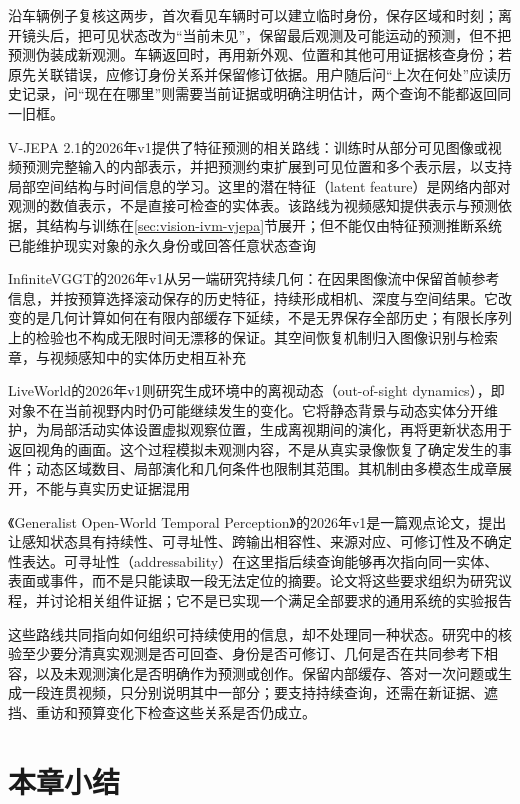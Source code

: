 沿车辆例子复核这两步，首次看见车辆时可以建立临时身份，保存区域和时刻；离开镜头后，把可见状态改为“当前未见”，保留最后观测及可能运动的预测，但不把预测伪装成新观测。车辆返回时，再用新外观、位置和其他可用证据核查身份；若原先关联错误，应修订身份关系并保留修订依据。用户随后问“上次在何处”应读历史记录，问“现在在哪里”则需要当前证据或明确注明估计，两个查询不能都返回同一旧框。

V-JEPA 2.1的2026年v1提供了特征预测的相关路线：训练时从部分可见图像或视频预测完整输入的内部表示，并把预测约束扩展到可见位置和多个表示层，以支持局部空间结构与时间信息的学习。这里的潜在特征（latent feature）是网络内部对观测的数值表示，不是直接可检查的实体表。该路线为视频感知提供表示与预测依据，其结构与训练在\ref{sec:vision-ivm-vjepa}节展开；但不能仅由特征预测推断系统已能维护现实对象的永久身份或回答任意状态查询

InfiniteVGGT的2026年v1从另一端研究持续几何：在因果图像流中保留首帧参考信息，并按预算选择滚动保存的历史特征，持续形成相机、深度与空间结果。它改变的是几何计算如何在有限内部缓存下延续，不是无界保存全部历史；有限长序列上的检验也不构成无限时间无漂移的保证。其空间恢复机制归入图像识别与检索章，与视频感知中的实体历史相互补充

LiveWorld的2026年v1则研究生成环境中的离视动态（out-of-sight dynamics），即对象不在当前视野内时仍可能继续发生的变化。它将静态背景与动态实体分开维护，为局部活动实体设置虚拟观察位置，生成离视期间的演化，再将更新状态用于返回视角的画面。这个过程模拟未观测内容，不是从真实录像恢复了确定发生的事件；动态区域数目、局部演化和几何条件也限制其范围。其机制由多模态生成章展开，不能与真实历史证据混用

《Generalist Open-World Temporal Perception》的2026年v1是一篇观点论文，提出让感知状态具有持续性、可寻址性、跨输出相容性、来源对应、可修订性及不确定性表达。可寻址性（addressability）在这里指后续查询能够再次指向同一实体、表面或事件，而不是只能读取一段无法定位的摘要。论文将这些要求组织为研究议程，并讨论相关组件证据；它不是已实现一个满足全部要求的通用系统的实验报告

这些路线共同指向如何组织可持续使用的信息，却不处理同一种状态。研究中的核验至少要分清真实观测是否可回查、身份是否可修订、几何是否在共同参考下相容，以及未观测演化是否明确作为预测或创作。保留内部缓存、答对一次问题或生成一段连贯视频，只分别说明其中一部分；要支持持续查询，还需在新证据、遮挡、重访和预算变化下检查这些关系是否仍成立。

\section{本章小结}
\label{sec:vision-overview-summary}

